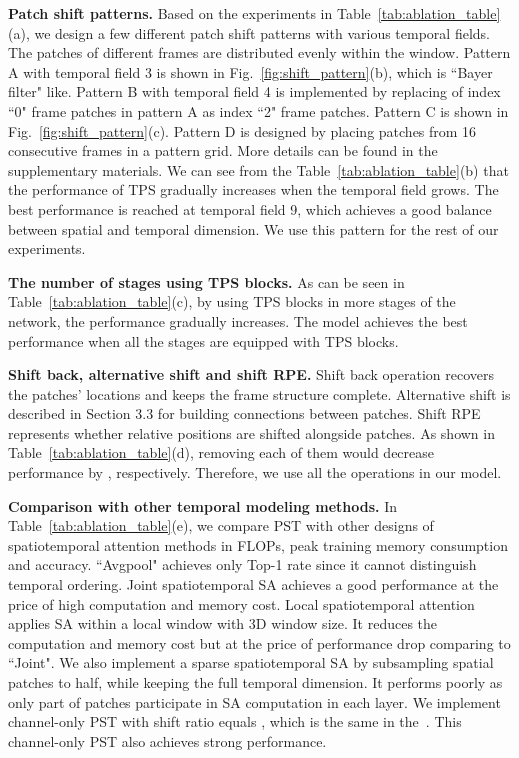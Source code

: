 \documentclass[runningheads]{llncs}
\begin{document}
	\textbf{Patch shift patterns.} Based on the experiments in Table~\ref{tab:ablation_table}(a), we design a few different patch shift patterns with various temporal fields. The patches of different frames are distributed evenly within the window. Pattern A with temporal field 3 is shown in Fig.~\ref{fig:shift_pattern}(b), which is ``Bayer filter" like. Pattern B with temporal field 4 is implemented by replacing  of index ``0" frame patches in pattern A as index ``2" frame patches. Pattern C is shown in Fig.~\ref{fig:shift_pattern}(c). Pattern D is designed by placing patches from 16 consecutive frames in a  pattern grid. More details can be found in the supplementary materials. We can see from the Table~\ref{tab:ablation_table}(b) that the performance of TPS gradually increases when the temporal field grows. The best performance is reached at temporal field 9, which achieves a good balance between spatial and temporal dimension. We use this pattern for the rest of our experiments.
	
	\textbf{The number of stages using TPS blocks.} As can be seen in Table~\ref{tab:ablation_table}(c), by using TPS blocks in more stages of the network, the performance gradually increases. The model achieves the best performance when all the stages are equipped with TPS blocks.
	
	\textbf{Shift back, alternative shift and shift RPE.} Shift back operation recovers the patches' locations and keeps the frame structure complete. Alternative shift is described in Section 3.3 for building connections between patches. Shift RPE represents whether relative positions are shifted alongside patches. As shown in Table~\ref{tab:ablation_table}(d), removing each of them would decrease performance by , respectively. Therefore, we use all the operations in our model.
	
	
	\textbf{Comparison with other temporal modeling methods.} In Table~\ref{tab:ablation_table}(e), we compare PST with other designs of spatiotemporal attention methods in FLOPs, peak training memory consumption and accuracy. ``Avgpool" achieves only  Top-1 rate since it cannot distinguish temporal ordering. Joint spatiotemporal SA achieves a good performance at the price of high computation and memory cost. Local spatiotemporal attention~\cite{ZeLiu2021VideoST} applies SA within a local window with 3D window size. It reduces the computation and memory cost but at the price of performance drop comparing to ``Joint". We also implement a sparse spatiotemporal SA by subsampling spatial patches to half, while keeping the full temporal dimension. It performs poorly as only part of patches participate in SA computation in each layer. We implement channel-only PST with shift ratio equals , which is the same in the~\cite{lin2019tsm}. This channel-only PST also achieves strong performance. 
	
\end{document}

